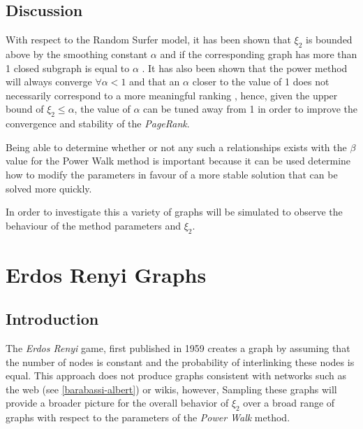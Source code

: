 \documentclass[11pt, twoside]{report}
\begin{document}
\subsection{Discussion}
With respect to the Random Surfer model, it has been shown that
$\xi_{2}$  is bounded above by the smoothing
constant $\alpha$
and if the corresponding graph has more than 1
closed subgraph is equal to $\alpha$
\cite{haveliwalaSecondEigenvalueGoogle2003}. It has also been shown that the power method
will always converge $\forall \alpha <1$ \cite{bianchiniPageRank2005} and that an
$\alpha$ closer to the value of 1 does not necessarily correspond to a more
meaningful ranking \cite{boldiPageRankFunctionDamping2005}, hence, given the upper
bound of $\xi_{2} \leq \alpha$, the value of $\alpha$ can be tuned away from
1 in order to improve the convergence and stability of the \textit{PageRank}.

Being able to determine whether or not any such a relationships exists with the \(\beta\) value for the Power Walk method is important because it can be used determine how to modify the parameters in favour of a more stable solution that can be solved more quickly.

In order to investigate this a variety of graphs will be simulated to observe the behaviour of the method parameters and \(\xi_{2}\).



\section{Erdos Renyi Graphs}
\label{erdos-renyi}
\subsection{Introduction}
\label{sec:org56225bf}
The \emph{Erdos Renyi} game, first published in 1959 \cite{renyiRandomGraphs1959} creates a graph by assuming that the number of nodes is constant and the probability of interlinking these nodes is equal. This approach does not produce graphs consistent with networks such as
the web (see \ref{barabassi-albert}) or wikis, however, Sampling these graphs will
provide a broader picture for the overall behavior of \(\xi_{2}\) over a broad
range of graphs with respect to the parameters of the \emph{Power Walk} method.
\end{document}
